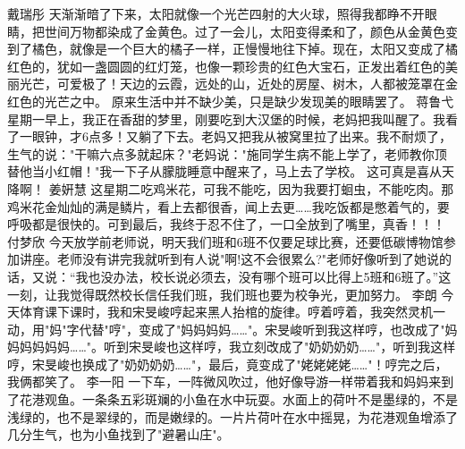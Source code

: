 {}\markdownRendererInterblockSeparator
{}戴瑞彤\markdownRendererInterblockSeparator
{}天渐渐暗了下来，太阳就像一个光芒四射的大火球，照得我都睁不开眼睛，把世间万物都染成了金黄色。过了一会儿，太阳变得柔和了，颜色从金黄色变到了橘色，就像是一个巨大的橘子一样，正慢慢地往下掉。现在，太阳又变成了橘红色的，犹如一盏圆圆的红灯笼，也像一颗珍贵的红色大宝石，正发出着红色的美丽光芒，可爱极了！天边的云霞，远处的山，近处的房屋、树木，人都被笼罩在金红色的光芒之中。\markdownRendererInterblockSeparator
{}原来生活中并不缺少美，只是缺少发现美的眼睛罢了。\markdownRendererInterblockSeparator
{}\markdownRendererInterblockSeparator
{}蒋鲁弋\markdownRendererInterblockSeparator
{}星期一早上，我正在香甜的梦里，刚要吃到大汉堡的时候，老妈把我叫醒了。我看了一眼钟，才6点多！又躺了下去。老妈又把我从被窝里拉了出来。我不耐烦了，生气的说："干嘛六点多就起床？"老妈说："施同学生病不能上学了，老师教你顶替他当小红帽！"我一下子从朦胧睡意中醒来了，马上去了学校。\markdownRendererInterblockSeparator
{}这可真是喜从天降啊！\markdownRendererInterblockSeparator
{}\markdownRendererInterblockSeparator
{}姜姸慧\markdownRendererInterblockSeparator
{}这星期二吃鸡米花，可我不能吃，因为我要打蛔虫，不能吃肉。那鸡米花金灿灿的满是鳞片，看上去都很香，闻上去更……我吃饭都是憋着气的，要呼吸都是很快的。可到最后，我终于忍不住了，一口全放到了嘴里，真香！！！\markdownRendererInterblockSeparator
{}\markdownRendererInterblockSeparator
{}付梦欣\markdownRendererInterblockSeparator
{}今天放学前老师说，明天我们班和6班不仅要足球比赛，还要低碳博物馆参加讲座。老师没有讲完我就听到有人说"啊!这不会很累么?"老师好像听到了她说的话，又说：“我也没办法，校长说必须去，没有哪个班可以比得上5班和6班了。”这一刻，让我觉得既然校长信任我们班，我们班也要为校争光，更加努力。\markdownRendererInterblockSeparator
{}\markdownRendererInterblockSeparator
{}李朗\markdownRendererInterblockSeparator
{}今天体育课下课时，我和宋旻峻哼起来黑人抬棺的旋律。哼着哼着，我突然灵机一动，用"妈"字代替"哼"，变成了"妈妈妈妈……"。宋旻峻听到我这样哼，也改成了"妈妈妈妈妈妈……"。听到宋旻峻也这样哼，我立刻改成了"奶奶奶奶……"，听到我这样哼，宋旻峻也换成了"奶奶奶奶……"，最后，竟变成了"姥姥姥姥……"！哼完之后，我俩都笑了。\markdownRendererInterblockSeparator
{}\markdownRendererInterblockSeparator
{}李一阳\markdownRendererInterblockSeparator
{}一下车，一阵微风吹过，他好像导游一样带着我和妈妈来到了花港观鱼。一条条五彩斑斓的小鱼在水中玩耍。水面上的荷叶不是墨绿的，不是浅绿的，也不是翠绿的，而是嫩绿的。一片片荷叶在水中摇晃，为花港观鱼增添了几分生气，也为小鱼找到了"避暑山庄"。\markdownRendererInterblockSeparator
